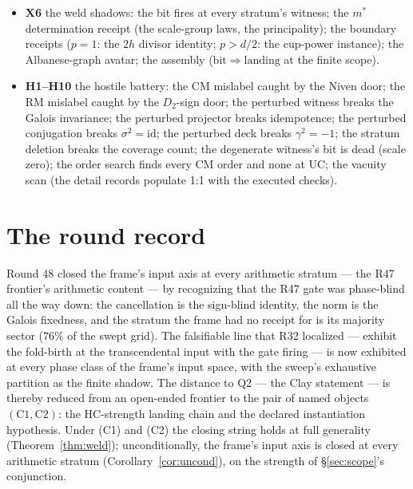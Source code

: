 \documentclass[11pt]{article}
\begin{document}
\begin{itemize}
$516$, FOLD $24$, DEGEN $8$); the quadraticity law $z^2-tz+1=0$ at
every instance.
\item \textbf{X6} the weld shadows: the bit fires at every stratum's
witness; the $m^*$ determination receipt (the scale-group laws, the
principality); the boundary receipts ($p=1$: the $2h$ divisor
identity; $p>d/2$: the cup-power instance); the Albanese-graph
avatar; the assembly ($\mathrm{bit}\Rightarrow\mathrm{landing}$ at
the finite scope).
\item \textbf{H1--H10} the hostile battery: the CM mislabel caught
by the Niven door; the RM mislabel caught by the $D_2$-sign door;
the perturbed witness breaks the Galois invariance; the perturbed
projector breaks idempotence; the perturbed conjugation breaks
$\sigma^2=\mathrm{id}$; the perturbed deck breaks $\gamma^2=-1$; the
stratum deletion breaks the coverage count; the degenerate witness's
bit is dead (scale zero); the order search finds every CM order and
none at UC; the vacuity scan (the detail records populate 1:1 with
the executed checks).
\end{itemize}

\section{The round record}

Round 48 closed the frame's input axis at every arithmetic stratum
--- the R47 frontier's arithmetic content --- by recognizing that
the R47 gate was
phase-blind all the way down: the cancellation is the sign-blind
identity, the norm is the Galois fixedness, and the stratum the
frame had no receipt for is its majority sector ($76\%$ of the
swept grid). The falsifiable line that R32 localized --- exhibit the
fold-birth at the transcendental input with the gate firing --- is
now exhibited at every phase class of the frame's input space, with
the sweep's exhaustive partition as the finite shadow. The distance
to Q2 --- the Clay statement --- is thereby reduced from an
open-ended frontier to the pair of named objects
$(\mathrm{C1},\mathrm{C2})$: the HC-strength landing chain and the
declared instantiation hypothesis. Under (C1) and (C2) the closing
string holds at full generality (Theorem~\ref{thm:weld});
unconditionally, the frame's input axis is closed at every
arithmetic stratum (Corollary~\ref{cor:uncond}), on the strength of
\S\ref{sec:scope}'s conjunction.
\end{document}
